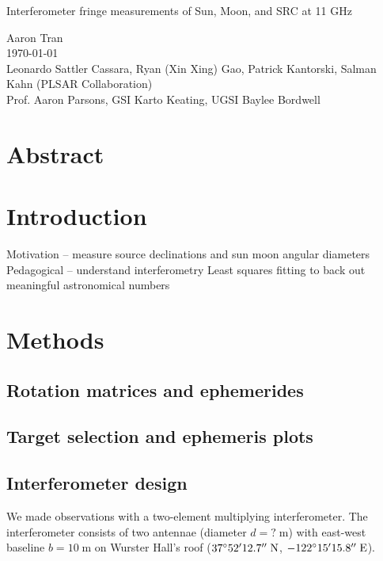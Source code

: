 \documentclass[10pt]{article}
\newcommand {\mt}{\mathrm}
\newcommand {\unit}[1]{\; \mt{#1}}
\begin{document}
\begin{center}
\Large{Interferometer fringe measurements of Sun, Moon, and SRC at 11 GHz}

\large
Aaron Tran \\
\today \\
Leonardo Sattler Cassara, Ryan (Xin Xing) Gao, Patrick Kantorski, Salman Kahn
(PLSAR Collaboration) \\
Prof. Aaron Parsons, GSI Karto Keating, UGSI Baylee Bordwell
\end{center}
\section*{Abstract}


\section{Introduction}

Motivation -- measure source declinations and sun moon angular diameters
Pedagogical -- understand interferometry
Least squares fitting to back out meaningful astronomical numbers


\section{Methods}

\subsection{Rotation matrices and ephemerides}

\subsection{Target selection and ephemeris plots}

\subsection{Interferometer design}

We made observations with a two-element multiplying interferometer.
The interferometer consists of two antennae (diameter $d = ? \unit{m}$) with
east-west baseline $b = 10 \unit{m}$ on Wurster Hall's roof
($37\degree 52' 12.7'' \unit{N}$, $-122\degree 15' 15.8'' \unit{E}$).
\end{document}
